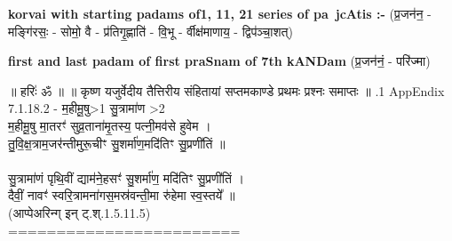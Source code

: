 \documentclass[17pt]{extarticle}
\begin{document}
\textbf{korvai with starting padams of1, 11, 21 series of pa~jcAtis :-} \newline
(प्र॒जन॑न॒ - मङ्गि॑रसः॒ - सोमो॒ वै - प्र॑तिगृ॒ह्णाति॑ - वि॒भू - र्वीक्ष॑माणाय॒ - द्विप॑ञ्चा॒शत्) \newline

\textbf{first and last padam of first praSnam of 7th kANDam} \newline
(प्र॒जन॑नं॒ - परि॑ज्मा) \newline 


॥ हरिः॑ ॐ ॥
॥ कृष्ण यजुर्वेदीय तैत्तिरीय संहितायां सप्तमकाण्डे प्रथमः प्रश्नः समाप्तः ॥ \newline
{}.1   AppEndix\\7.1.18.2 - म॒हीमू॒षु>1 सु॒त्रामा॑ण >2\\म॒हीमू॒षु मा॒तरꣳ॑ सुव्र॒ताना॑मृ॒तस्य॒ पत्नी॒मव॑से हुवेम । \\तु॒वि॒क्ष॒त्राम॒जर॑न्तीमुरू॒चीꣳ सु॒शर्मा॑ण॒मदि॑तिꣳ सु॒प्रणी॑तिं ॥ \\\\सु॒त्रामा॑णं पृथि॒वीं द्याम॑ने॒हसꣳ॑ सु॒शर्मा॑ण॒ मदि॑तिꣳ सु॒प्रणी॑तिं । \\दैवीं॒ नावꣳ॑ स्वरि॒त्रामना॑गस॒मस्र॑वन्ती॒मा रु॑हेमा स्व॒स्तये᳚ ॥\\(आप्पेअरिन्ग् इन् ट्.श्.1.5.11.5)\\========================\\
\pagebreak
        
\end{document}
